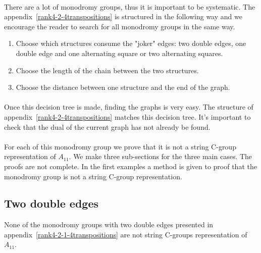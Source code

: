 \paragraph{}
There are a lot of monodromy groups, thus it is important to be systematic. The appendix~\ref{rank4-2-4transpositions} is structured in the following way and we encourage the reader to search for all monodromy groups in the same way.

\begin{enumerate}
  \item Choose which structures consume the "joker" edges: two double edges, one double edge and one alternating square or two alternating squares.
  \item Choose the length of the chain between the two structures.
  \item Choose the distance between one structure and the end of the graph.
\end{enumerate}

\paragraph{}
Once this decision tree is made, finding the graphs is very easy. The structure of appendix~\ref{rank4-2-4transpositions} matches this decision tree. It's important to check that the dual of the current graph has not already be found.

\paragraph{}
For each of this monodromy group we prove that it is not a string C-group representation of $A_{11}$. We make three sub-sections for the three main cases. The proofs are not complete. In the first examples a method is given to proof that the monodromy group is not a string C-group representation.

\subsection{Two double edges}

\begin{theorem}
  None of the monodromy groups with two double edges presented in appendix~\ref{rank4-2-1-4transpositions} are not string C-groups representation of $A_{11}$.
\end{theorem}

